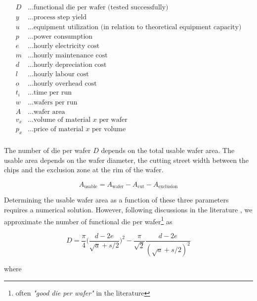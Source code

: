 \documentclass[10pt]{article}
\begin{document}
\begin{align*}
        D &\dots \text{functional die per wafer (tested successfully)} \label{def:cost_wafer_first} \\
        y &\dots \text{process step yield} \\
        u &\dots \text{equipment utilization (in relation to theoretical equipment capacity)} \\
        p &\dots \text{power consumption} \\
        e &\dots \text{hourly electricity cost} \\
        m &\dots \text{hourly maintenance cost} \\
        d &\dots \text{hourly depreciation cost}\\
        l &\dots \text{hourly labour cost} \\
        o &\dots \text{hourly overhead cost} \\
        t_i &\dots \text{time per run} \\
        w &\dots \text{wafers per run} \\
        A &\dots \text{wafer area} \\
        v_x &\dots \text{volume of material $x$ per wafer} \\
        p_x &\dots \text{price of material $x$ per volume}\\
\end{align*}

The number of die per wafer $D$ depends on the total usable wafer area. The usable area depends on the wafer diameter, the cutting street width between the chips and the exclusion zone at the rim of the wafer.

\begin{equation}
	A_{\text{usable}}=A_{\text{wafer}}-A_{\text{cut}}-A_{\text{exclusion}}
\end{equation}

Determining the usable wafer area as a function of these three parameters requires a numerical solution. However, following discussions in the literature \cite{de2005investigation}, we approximate the number of functional die per wafer\footnote{often \textit{"good die per wafer"} in the literature} as

\begin{equation}
\label{eqn:dpw}
	D=\frac{\pi}{4}  \bigg ( \frac{d-2e}{\sqrt{a}+s/2} \bigg ) ^2 - \frac{\pi}{\sqrt{2}}\frac{d-2e}{(\sqrt{a}+s/2)^2}
\end{equation}

where
\end{document}
